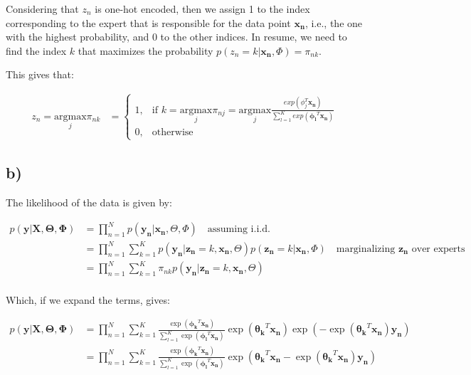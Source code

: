 \documentclass[12pt,a4paper,oneside]{paper}
\begin{document}
Considering that $z_n$ is one-hot encoded, then we assign 1 to the index corresponding to the expert that is responsible
for the data point $\bm{x_n}$, i.e., the one with the highest probability, and 0 to the other indices.
In resume, we need to find the index $k$ that maximizes the probability $p(z_n = k | \bm{x_n}, \Phi) = \pi_{nk}$.

This gives that:

\begin{align*}
    z_n = \underset{j}{\mathrm{argmax}} \pi_{nk}
    &= \begin{cases}
        1, & \text{if } k = \underset{j}{\mathrm{argmax}} \pi_{nj} = \underset{j}{\mathrm{argmax}} \frac{exp(\phi_j^T \bm{x_n})}{\sum_{l=1}^{K} exp(\bm{\phi_l}^T \bm{x_n})} \\
        0, & \text{otherwise}
    \end{cases}
\end{align*}

\subsection*{b)}

The likelihood of the data is given by:

\begin{align*}
    p(\bm{y} | \bm{X}, \bm{\Theta}, \bm{\Phi}) &= \prod_{n=1}^{N} p(\bm{y_n} | \bm{x_n}, \Theta, \Phi) \quad \text{assuming i.i.d.} \\
    &= \prod_{n=1}^{N} \sum_{k=1}^{K} p(\bm{y_n} | \bm{z_n} = k, \bm{x_n}, \Theta) p(\bm{z_n} = k | \bm{x_n}, \Phi) \quad \text{marginalizing $\bm{z_n}$ over experts} \\
    &= \prod_{n=1}^{N} \sum_{k=1}^{K} \pi_{nk} p(\bm{y_n} | \bm{z_n} = k, \bm{x_n}, \Theta) \\
\end{align*}

Which, if we expand the terms, gives:

\begin{align*}
    p(\bm{y} | \bm{X}, \bm{\Theta}, \bm{\Phi}) &= \prod_{n=1}^{N} \sum_{k=1}^{K} \frac{\exp(\bm{\phi_k}^T \bm{x_n})}{\sum_{l=1}^{K} \exp(\bm{\phi_l}^T \bm{x_n})} \exp(\bm{\theta_k}^T \bm{x_n}) \exp(-\exp(\bm{\theta_k}^T \bm{x_n}) \bm{y_n}) \\
    &= \prod_{n=1}^{N} \sum_{k=1}^{K} \frac{\exp(\bm{\phi_k}^T \bm{x_n})}{\sum_{l=1}^{K} \exp(\bm{\phi_l}^T \bm{x_n})} \exp(\bm{\theta_k}^T \bm{x_n} -\exp(\bm{\theta_k}^T \bm{x_n}) \bm{y_n}) \\
\end{align*}
\end{document}
